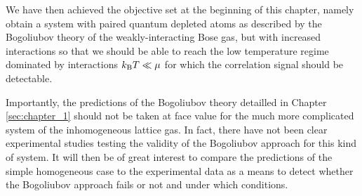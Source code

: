 We have then achieved the objective set at the beginning of this chapter, namely obtain a system with \kmk paired quantum depleted atoms as described by the Bogoliubov theory of the weakly-interacting Bose gas, but with increased interactions so that we should be able to reach the low temperature regime dominated by interactions $k_{\mathrm{B}} T \ll \mu$ for which the \kmk correlation signal should be detectable. 

Importantly, the predictions of the Bogoliubov theory detailled in Chapter \ref{sec:chapter_1} should not be taken at face value for the much more complicated system of the inhomogeneous lattice gas. In fact, there have not been clear experimental studies testing the validity of the Bogoliubov approach for this kind of system. It will then be of great interest to compare the predictions of the simple homogeneous case to the experimental data as a means to detect whether the Bogoliubov approach fails or not and under which conditions.